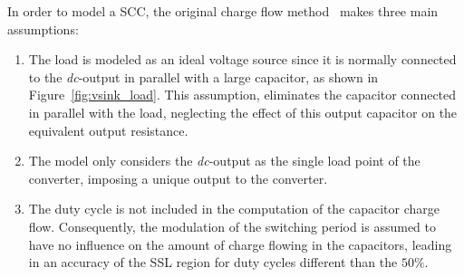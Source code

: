 In order to model a SCC, the original charge flow method~\cite{95Makowski} makes three main assumptions:
\begin{enumerate}
  \item The load is modeled as an ideal voltage source since it is normally connected to the \emph{dc}-output in parallel with a large capacitor, as shown in Figure~\ref{fig:vsink_load}. This assumption, eliminates the capacitor connected in parallel with the load, neglecting the effect of this output capacitor on the equivalent output resistance.

  \item The model only considers the \emph{dc}-output as the single load point of the converter, imposing a unique output to the converter.

  \item The duty cycle is not included in the computation of the capacitor charge flow. Consequently, the modulation of the switching period is assumed to have no influence on the amount of charge flowing in the capacitors, leading in an accuracy of the SSL region for duty cycles different than the $50\%$.
\end{enumerate}

